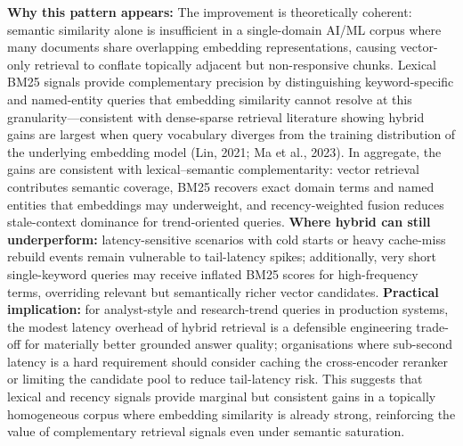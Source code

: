 \noindent \textbf{Why this pattern appears:} The improvement is theoretically coherent: semantic similarity alone is insufficient in a single-domain AI/ML corpus where many documents share overlapping embedding representations, causing vector-only retrieval to conflate topically adjacent but non-responsive chunks. Lexical BM25 signals provide complementary precision by distinguishing keyword-specific and named-entity queries that embedding similarity cannot resolve at this granularity---consistent with dense-sparse retrieval literature showing hybrid gains are largest when query vocabulary diverges from the training distribution of the underlying embedding model (Lin, 2021; Ma et al., 2023). In aggregate, the gains are consistent with lexical--semantic complementarity: vector retrieval contributes semantic coverage, BM25 recovers exact domain terms and named entities that embeddings may underweight, and recency-weighted fusion reduces stale-context dominance for trend-oriented queries. \textbf{Where hybrid can still underperform:} latency-sensitive scenarios with cold starts or heavy cache-miss rebuild events remain vulnerable to tail-latency spikes; additionally, very short single-keyword queries may receive inflated BM25 scores for high-frequency terms, overriding relevant but semantically richer vector candidates. \textbf{Practical implication:} for analyst-style and research-trend queries in production systems, the modest latency overhead of hybrid retrieval is a defensible engineering trade-off for materially better grounded answer quality; organisations where sub-second latency is a hard requirement should consider caching the cross-encoder reranker or limiting the candidate pool to reduce tail-latency risk. This suggests that lexical and recency signals provide marginal but consistent gains in a topically homogeneous corpus where embedding similarity is already strong, reinforcing the value of complementary retrieval signals even under semantic saturation.

